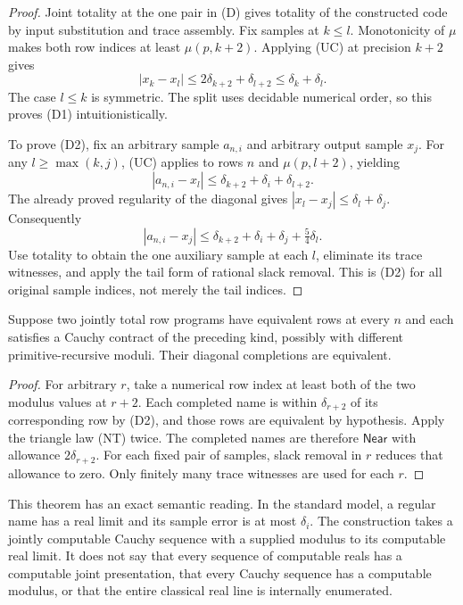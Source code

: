 \begin{proof}
Joint totality at the one pair in (D) gives totality of the constructed code
by input substitution and trace assembly. Fix samples at $k\leq l$.
Monotonicity of $\mu$ makes both row indices at least $\mu(p,k+2)$.
Applying (UC) at precision $k+2$ gives
\[
 |x_k-x_l|\leq 2\delta_{k+2}+\delta_{l+2}
       \leq\delta_k+\delta_l.
\]
The case $l\leq k$ is symmetric. The split uses decidable numerical order,
so this proves (D1) intuitionistically.

To prove (D2), fix an arbitrary sample $a_{n,i}$ and arbitrary output sample
$x_j$. For any $l\geq\max(k,j)$, (UC) applies to rows $n$ and
$\mu(p,l+2)$, yielding
\[
 |a_{n,i}-x_l|\leq\delta_{k+2}+\delta_i+\delta_{l+2}.
\]
The already proved regularity of the diagonal gives
$|x_l-x_j|\leq\delta_l+\delta_j$. Consequently
\[
 |a_{n,i}-x_j|
 \leq\delta_{k+2}+\delta_i+\delta_j
             +\tfrac54\delta_l.
\]
Use totality to obtain the one auxiliary sample at each $l$, eliminate its
trace witnesses, and apply the tail form of rational slack removal. This is
(D2) for all original sample indices, not merely the tail indices.
\end{proof}

\begin{proposition}
\label{prop:relational-completion-independence}
Suppose two jointly total row programs have equivalent rows at every $n$ and
each satisfies a Cauchy contract of the preceding kind, possibly with
different primitive-recursive moduli. Their diagonal completions are
equivalent.
\end{proposition}

\begin{proof}
For arbitrary $r$, take a numerical row index at least both of the two
modulus values at $r+2$. Each completed name is within $\delta_{r+2}$ of
its corresponding row by (D2), and those rows are equivalent by hypothesis.
Apply the triangle law (NT) twice. The completed names are therefore
$\mathsf{Near}$ with allowance $2\delta_{r+2}$. For each fixed pair of
samples, slack removal in $r$ reduces that allowance to zero. Only finitely
many trace witnesses are used for each $r$.
\end{proof}

This theorem has an exact semantic reading. In the standard model, a regular
name has a real limit and its sample error is at most $\delta_i$. The
construction takes a jointly computable Cauchy sequence with a supplied
modulus to its computable real limit. It does not say that every sequence of
computable reals has a computable joint presentation, that every Cauchy
sequence has a computable modulus, or that the entire classical real line
is internally enumerated.

